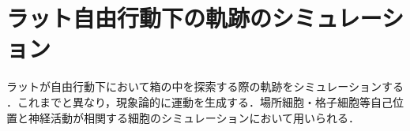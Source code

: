 \section{ラット自由行動下の軌跡のシミュレーション}
ラットが自由行動下において箱の中を探索する際の軌跡をシミュレーションする \cite{Raudies2012-gp}．これまでと異なり，現象論的に運動を生成する．場所細胞・格子細胞等自己位置と神経活動が相関する細胞のシミュレーションにおいて用いられる．
